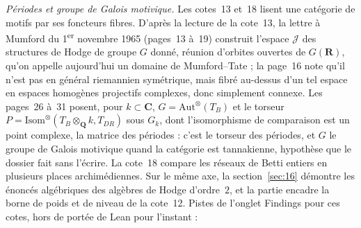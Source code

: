 \noindent\emph{Périodes et groupe de Galois motivique.} Les cotes~13 et~18 lisent une catégorie de motifs par ses foncteurs fibres. D'après la lecture de la cote~13, la lettre à Mumford du 1\textsuperscript{er} novembre 1965 (pages~13 à~19) construit l'espace $\mathcal J$ des structures de Hodge de groupe $G$ donné, réunion d'orbites ouvertes de $G(\mathbf R)$, qu'on appelle aujourd'hui un domaine de Mumford--Tate ; la page~16 note qu'il n'est pas en général riemannien symétrique, mais fibré au-dessus d'un tel espace en espaces homogènes projectifs complexes, donc simplement connexe. Les pages~26 à~31 posent, pour $k \subset \mathbf C$, $G = \mathrm{Aut}^\otimes(T_B)$ et le torseur $P = \mathrm{Isom}^\otimes(T_B \otimes_{\mathbf Q} k, T_{DR})$ sous $G_k$, dont l'isomorphisme de comparaison est un point complexe, la matrice des périodes : c'est le torseur des périodes, et $G$ le groupe de Galois motivique quand la catégorie est tannakienne, hypothèse que le dossier fait sans l'écrire. La cote~18 compare les réseaux de Betti entiers en plusieurs places archimédiennes. Sur le même axe, la section~\ref{sec:16} démontre les énoncés algébriques des algèbres de Hodge d'ordre~$2$, et la partie  encadre la borne de poids et de niveau de la cote~12.
\noindent Pistes de l'onglet Findings pour ces cotes, hors de portée de Lean pour l'instant :
